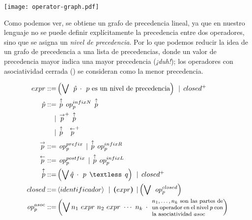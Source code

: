 {\begin{investigationfr}
\begin{center}
\texttt{[image: operator-graph.pdf]}
\label{fig:operator-graph}
\end{center}

Como podemos ver, se obtiene un grafo de precedencia lineal, ya que en nuestro lenguaje no se puede definir explícitamente la precedencia entre dos operadores, sino que se asigna un \emph{nivel de precedencia}. Por lo que podemos reducir la idea de un grafo de precedencia a una lista de precedencias, donde un valor de precedencia mayor indica una mayor precedencia (\emph{¡duh!}); los operadores con asociatividad cerrada () se consideran como la menor precedencia.

{   %
\newcommand{\overp}[1]{\overset{#1}{p}}
\renewcommand{\_}{\:\:}

\begin{equation*}
\begin{split}
expr ::=& \left( \bigvee \_ \hat{p} \_ \cdotp \_
                 \text{$p$ es un nivel de precedencia} \right) \_
        | \_ closed^{+}
\\
\hat{p} ::=& \_ \overp{\uparrow} \_ op_p^{infixN} \_ \overp{\uparrow} \\
          |& \_ \overp{\rightarrow}^{+} \_ \overp{\uparrow} \\
          |& \_ \overp{\uparrow}\quad \overp{\leftarrow}^{+}
\\
\overp{\rightarrow} ::=& \_ op_p^{prefix} \_
                       | \_ \overp{\uparrow} \_ op_p^{infixR}
\\
\overp{\leftarrow} ::=& \_ op_p^{postfix} \_
                      | \_ \overp{\uparrow} \_ op_p^{infixL}
\\
\overp{\uparrow} ::=& \left( \bigvee \hat{q} \_ \cdotp \_
                             p \_ \textless \_ q \right) \_
                    | \_ closed^{+}
\\
closed ::=& \left<identificador\right> \_
          | \_ \boldsymbol{(} expr \boldsymbol{)} \_
          | \left( \bigvee \_ op_p^{closed} \right)
\\
op_p^{asoc} ::=& \left( \bigvee n_1\ expr\ n_2\ expr\ \cdots\ n_k \_ \cdotp \_
                        \parbox{0.3\textwidth}{\footnotesize$n_1,\ldots,n_k$ son las partes de un operador en el nivel $p$ con la asociatividad $asoc$} \right)
\end{split}
\end{equation*}
\label{fig:mixfix-grammar}
}
\end{investigationfr}

}
